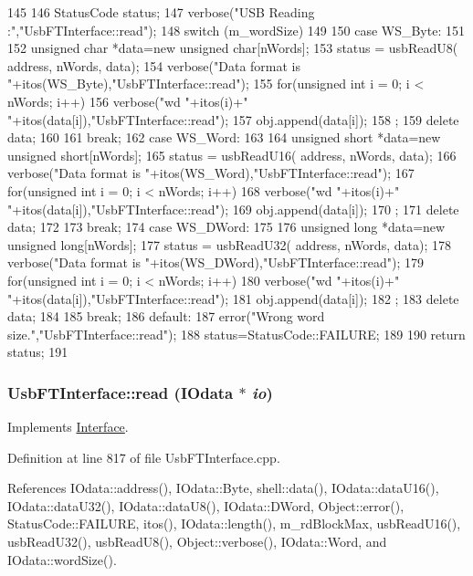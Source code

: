 \begin{DoxyCode}
145 {
146   StatusCode status;
147   verbose("USB Reading :","UsbFTInterface::read");
148   switch (m_wordSize)
149   {
150   case WS_Byte:
151     {  
152       unsigned char *data=new unsigned char[nWords];
153       status = usbReadU8( address, nWords, data);
154       verbose("Data format is "+itos(WS_Byte),"UsbFTInterface::read");
155       for(unsigned int i = 0; i < nWords; i++){
156         verbose("wd "+itos(i)+" "+itos(data[i]),"UsbFTInterface::read");
157         obj.append(data[i]);
158       };
159       delete data;
160     }
161     break;
162   case WS_Word:
163     {
164       unsigned short *data=new unsigned short[nWords];
165       status = usbReadU16( address, nWords, data);
166       verbose("Data format is "+itos(WS_Word),"UsbFTInterface::read");
167       for(unsigned int i = 0; i < nWords; i++){
168         verbose("wd "+itos(i)+" "+itos(data[i]),"UsbFTInterface::read");
169         obj.append(data[i]);
170       };
171       delete data;
172     }
173     break;
174   case WS_DWord:
175     {
176       unsigned long *data=new unsigned long[nWords];
177       status = usbReadU32( address, nWords, data);
178       verbose("Data format is "+itos(WS_DWord),"UsbFTInterface::read");
179       for(unsigned int i = 0; i < nWords; i++){
180         verbose("wd "+itos(i)+" "+itos(data[i]),"UsbFTInterface::read");
181         obj.append(data[i]);
182       };
183       delete data;
184     }
185     break;    
186   default:
187     error("Wrong word size.","UsbFTInterface::read");
188     status=StatusCode::FAILURE;
189   }
190   return status;
191 }
\end{DoxyCode}
\hypertarget{classUsbFTInterface_ab9daafce1d7878b95ba0655a570922e2}{
\subsubsection[{read}]{ UsbFTInterface::read ({\bf IOdata} $\ast$ {\em io})}}
\label{classUsbFTInterface_ab9daafce1d7878b95ba0655a570922e2}


Implements \hyperlink{classInterface_a99136b67c8e6cbcaa0477c36940ac2ef}{Interface}.

Definition at line 817 of file UsbFTInterface.cpp.

References IOdata::address(), IOdata::Byte, shell::data(), IOdata::dataU16(), IOdata::dataU32(), IOdata::dataU8(), IOdata::DWord, Object::error(), StatusCode::FAILURE, itos(), IOdata::length(), m\_\-rdBlockMax, usbReadU16(), usbReadU32(), usbReadU8(), Object::verbose(), IOdata::Word, and IOdata::wordSize().

